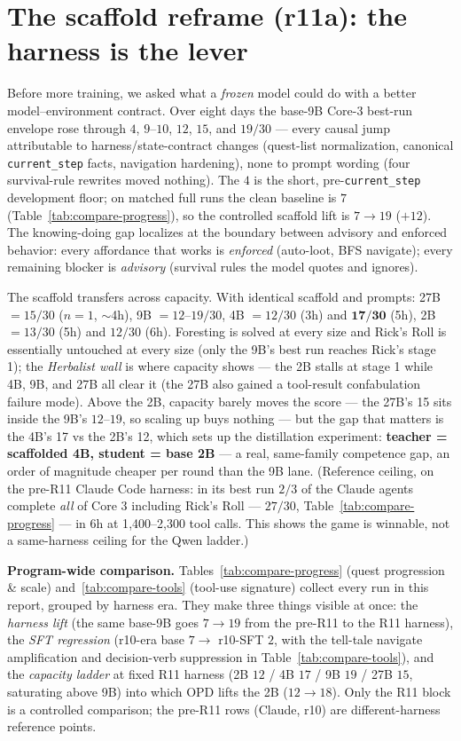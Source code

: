 \documentclass[11pt]{article}
\begin{document}
\section{The scaffold reframe (r11a): the harness is the lever}

Before more training, we asked what a \emph{frozen} model could do with a better
model--environment contract. Over eight days the base-9B Core-3 best-run envelope rose through
$4$, $9$--$10$, $12$, $15$, and $19/30$ --- every causal jump
attributable to harness/state-contract changes (quest-list normalization, canonical
\texttt{current\_step} facts, navigation hardening), none to prompt wording (four survival-rule
rewrites moved nothing). The $4$ is the short, pre-\texttt{current\_step} development floor; on
matched full runs the clean baseline is $7$ (Table~\ref{tab:compare-progress}), so the controlled
scaffold lift is $7 \rightarrow 19$ ($+12$). The knowing-doing gap localizes at the boundary
between advisory and enforced behavior: every affordance that works is \emph{enforced} (auto-loot, BFS navigate); every
remaining blocker is \emph{advisory} (survival rules the model quotes and ignores).

The scaffold transfers across capacity. With identical scaffold and prompts:
27B $= 15/30$ ($n{=}1$, $\sim$4h), 9B $= 12$--$19/30$, 4B $= 12/30$ (3h) and $\mathbf{17/30}$
(5h), 2B $= 13/30$ (5h) and $12/30$ (6h). Foresting is solved at every size and Rick's Roll is
essentially untouched at every size (only the 9B's best run reaches Rick's stage 1); the
\emph{Herbalist wall} is where capacity shows --- the 2B stalls at stage 1 while 4B, 9B, and 27B
all clear it (the 27B also gained a tool-result confabulation failure mode). Above the 2B,
capacity barely moves the score --- the 27B's 15 sits inside the 9B's $12$--$19$, so scaling up
buys nothing --- but the gap that matters is the 4B's 17 vs the 2B's 12, which sets up the
distillation experiment: \textbf{teacher = scaffolded 4B, student =
base 2B} --- a real, same-family competence gap, an order of magnitude cheaper per round than the
9B lane. (Reference ceiling, on the pre-R11 Claude Code harness: in its best run $2/3$ of the
Claude agents complete \emph{all} of Core 3 including Rick's Roll --- $27/30$,
Table~\ref{tab:compare-progress} --- in 6h at 1{,}400--2{,}300 tool calls. This shows the game is
winnable, not a same-harness ceiling for the Qwen ladder.)

\textbf{Program-wide comparison.} Tables~\ref{tab:compare-progress} (quest progression \& scale)
and~\ref{tab:compare-tools} (tool-use signature) collect every run in this report, grouped by
harness era. They make three things visible at once: the \emph{harness lift} (the same base-9B
goes $7 \rightarrow 19$ from the pre-R11 to the R11 harness), the \emph{SFT regression} (r10-era
base $7 \rightarrow$ r10-SFT $2$, with the tell-tale navigate amplification and decision-verb
suppression in Table~\ref{tab:compare-tools}), and the \emph{capacity ladder} at fixed R11 harness
(2B $12$ / 4B $17$ / 9B $19$ / 27B $15$, saturating above 9B) into which OPD lifts the 2B
($12 \rightarrow 18$). Only the R11 block is a controlled comparison; the pre-R11 rows (Claude,
r10) are different-harness reference points.
\end{document}
